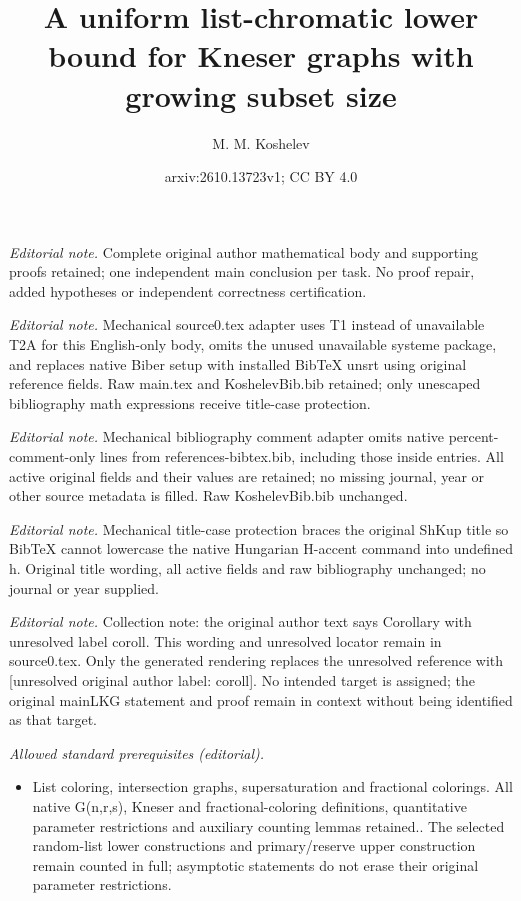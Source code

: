 \documentclass[10pt,a4paper]{article}
\title{A uniform list-chromatic lower bound for Kneser graphs with growing subset size}
\author{M. M. Koshelev}
\date{arxiv:2610.13723v1; CC BY 4.0}
\theoremstyle{remark}
\theoremstyle{definition}
\begin{document}
\maketitle
\noindent\textit{Editorial note.} Complete original author mathematical body and supporting proofs retained; one independent main conclusion per task. No proof repair, added hypotheses or independent correctness certification.\par\medskip
\noindent\textit{Editorial note.} Mechanical source0.tex adapter uses T1 instead of unavailable T2A for this English-only body, omits the unused unavailable systeme package, and replaces native Biber setup with installed BibTeX unsrt using original reference fields. Raw main.tex and KoshelevBib.bib retained; only unescaped bibliography math expressions receive title-case protection.\par\medskip
\noindent\textit{Editorial note.} Mechanical bibliography comment adapter omits native percent-comment-only lines from references-bibtex.bib, including those inside entries. All active original fields and their values are retained; no missing journal, year or other source metadata is filled. Raw KoshelevBib.bib unchanged.\par\medskip
\noindent\textit{Editorial note.} Mechanical title-case protection braces the original ShKup title so BibTeX cannot lowercase the native Hungarian H-accent command into undefined h. Original title wording, all active fields and raw bibliography unchanged; no journal or year supplied.\par\medskip
\noindent\textit{Editorial note.} Collection note: the original author text says Corollary with unresolved label coroll. This wording and unresolved locator remain in source0.tex. Only the generated rendering replaces the unresolved reference with [unresolved original author label: coroll]. No intended target is assigned; the original mainLKG statement and proof remain in context without being identified as that target.\par\medskip
\noindent\textit{Allowed standard prerequisites (editorial).}\begin{itemize}
\item List coloring, intersection graphs, supersaturation and fractional colorings. All native G(n,r,s), Kneser and fractional-coloring definitions, quantitative parameter restrictions and auxiliary counting lemmas retained.. The selected random-list lower constructions and primary/reserve upper construction remain counted in full; asymptotic statements do not erase their original parameter restrictions.
\end{itemize}\medskip
\end{document}
